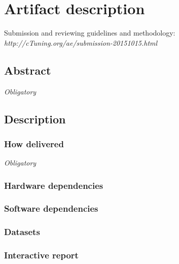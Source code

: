 \documentclass{sigplanconf}
\begin{document}


\appendix
\section{Artifact description}

Submission and reviewing guidelines and methodology: \\
{\em http://cTuning.org/ae/submission-20151015.html}

\subsection{Abstract}

{\em Obligatory}

\subsection{Description}
\subsubsection{How delivered}

{\em Obligatory}

\subsubsection{Hardware dependencies}

\subsubsection{Software dependencies}

\subsubsection{Datasets}

\subsubsection{Interactive report}

\end{document}
